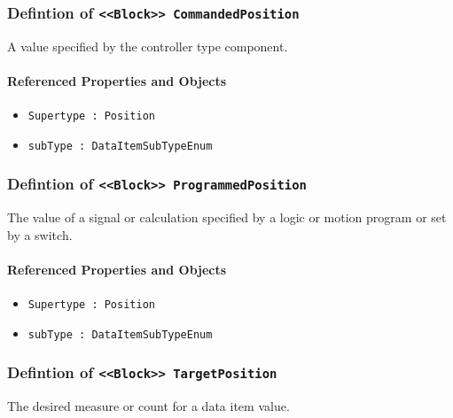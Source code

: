 \subsubsection{Defintion of \texttt{<<Block>> CommandedPosition}}
  \label{type:CommandedPosition}

\FloatBarrier

A value specified by the controller type component.

\FloatBarrier
\paragraph{Referenced Properties and Objects}

\begin{itemize}
\item \texttt{Supertype : Position}

\item \texttt{subType : DataItemSubTypeEnum}

\end{itemize}
\FloatBarrier
\subsubsection{Defintion of \texttt{<<Block>> ProgrammedPosition}}
  \label{type:ProgrammedPosition}

\FloatBarrier

The value of a signal or calculation specified by a logic or motion program or set by a switch.

\FloatBarrier
\paragraph{Referenced Properties and Objects}

\begin{itemize}
\item \texttt{Supertype : Position}

\item \texttt{subType : DataItemSubTypeEnum}

\end{itemize}
\FloatBarrier
\subsubsection{Defintion of \texttt{<<Block>> TargetPosition}}
  \label{type:TargetPosition}

\FloatBarrier

The desired measure or count for a data item value.

